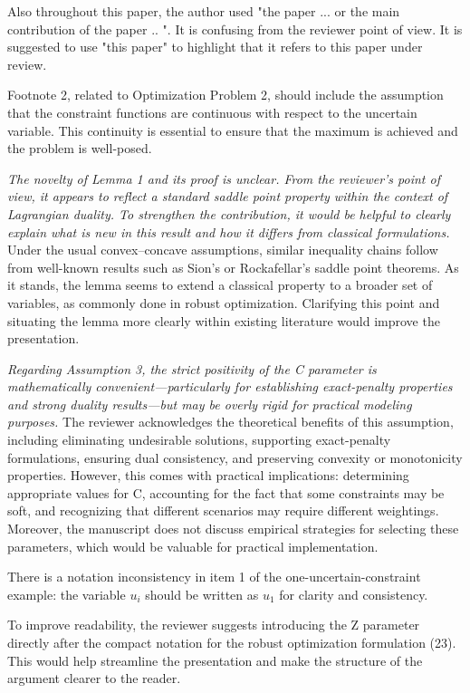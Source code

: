 \documentclass[journal,twoside,web]{ieeecolor}
\begin{document}
Also throughout this paper, the author used "the paper ... or the main contribution of the paper .. ". It is confusing from the reviewer point of view. It is suggested to use "this paper" to highlight that it refers to this paper under review.

Footnote 2, related to Optimization Problem 2, should include the assumption that the constraint functions are continuous with respect to the uncertain variable. This continuity is essential to ensure that the maximum is achieved and the problem is well-posed.

\textcolor{reviewerred}{\textit{The novelty of Lemma 1 and its proof is unclear. From the reviewer's point of view, it appears to reflect a standard saddle point property within the context of Lagrangian duality. To strengthen the contribution, it would be helpful to clearly explain what is new in this result and how it differs from classical formulations.}} Under the usual convex–concave assumptions, similar inequality chains follow from well-known results such as Sion's or Rockafellar's saddle point theorems. As it stands, the lemma seems to extend a classical property to a broader set of variables, as commonly done in robust optimization. Clarifying this point and situating the lemma more clearly within existing literature would improve the presentation.

\textcolor{reviewerred}{\textit{Regarding Assumption 3, the strict positivity of the C parameter is mathematically convenient—particularly for establishing exact-penalty properties and strong duality results—but may be overly rigid for practical modeling purposes.}} The reviewer acknowledges the theoretical benefits of this assumption, including eliminating undesirable solutions, supporting exact-penalty formulations, ensuring dual consistency, and preserving convexity or monotonicity properties. However, this comes with practical implications: determining appropriate values for C, accounting for the fact that some constraints may be soft, and recognizing that different scenarios may require different weightings. Moreover, the manuscript does not discuss empirical strategies for selecting these parameters, which would be valuable for practical implementation.

There is a notation inconsistency in item 1 of the one-uncertain-constraint example: the variable $u_i$ should be written as $u_1$ for clarity and consistency.

To improve readability, the reviewer suggests introducing the Z parameter directly after the compact notation for the robust optimization formulation (23). This would help streamline the presentation and make the structure of the argument clearer to the reader.
\end{document}

